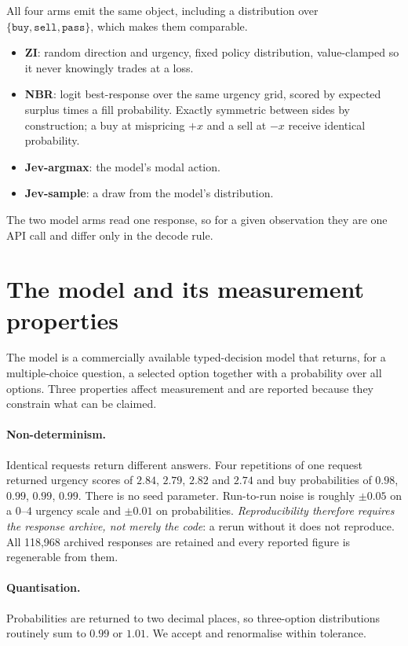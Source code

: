 \documentclass[11pt]{article}
\begin{document}
All four arms emit the same object, including a distribution over
$\{\texttt{buy}, \texttt{sell}, \texttt{pass}\}$, which makes them comparable.

\begin{itemize}
\item \textbf{ZI}: random direction and urgency, fixed policy distribution,
  value-clamped so it never knowingly trades at a loss.
\item \textbf{NBR}: logit best-response over the same urgency grid, scored by
  expected surplus times a fill probability. Exactly symmetric between sides by
  construction; a buy at mispricing $+x$ and a sell at $-x$ receive identical
  probability.
\item \textbf{Jev-argmax}: the model's modal action.
\item \textbf{Jev-sample}: a draw from the model's distribution.
\end{itemize}

The two model arms read one response, so for a given observation they are one
API call and differ only in the decode rule.

\section{The model and its measurement properties}

The model is a commercially available typed-decision model that returns, for a
multiple-choice question, a selected option together with a probability over
all options. Three properties affect measurement and are reported because they
constrain what can be claimed.

\paragraph{Non-determinism.} Identical requests return different answers. Four
repetitions of one request returned urgency scores of $2.84$, $2.79$, $2.82$
and $2.74$ and buy probabilities of $0.98$, $0.99$, $0.99$, $0.99$. There is no
seed parameter. Run-to-run noise is roughly $\pm 0.05$ on a $0$--$4$ urgency
scale and $\pm 0.01$ on probabilities. \emph{Reproducibility therefore requires
the response archive, not merely the code}: a rerun without it does not
reproduce. All 118{,}968 archived responses are retained and every reported figure is
regenerable from them.

\paragraph{Quantisation.} Probabilities are returned to two decimal places, so
three-option distributions routinely sum to $0.99$ or $1.01$. We accept and
renormalise within tolerance.
\end{document}
